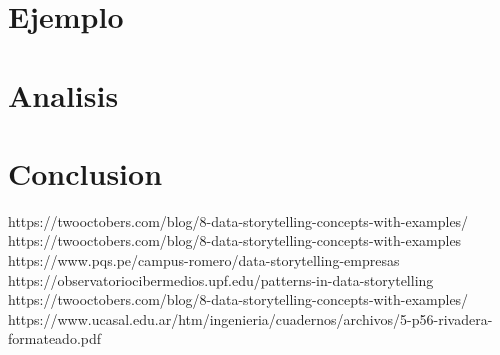 \documentclass[preprint,12pt]{elsarticle}
\begin{document}
\section{Ejemplo}

\section{Analisis}

\section{Conclusion}

	
	

	
	
	\newpage
	
	   \begin{thebibliography}{0}
                 https://twooctobers.com/blog/8-data-storytelling-concepts-with-examples/
                  https://twooctobers.com/blog/8-data-storytelling-concepts-with-examples
                   https://www.pqs.pe/campus-romero/data-storytelling-empresas
                   https://observatoriocibermedios.upf.edu/patterns-in-data-storytelling
                     https://twooctobers.com/blog/8-data-storytelling-concepts-with-examples/
                   https://www.ucasal.edu.ar/htm/ingenieria/cuadernos/archivos/5-p56-rivadera-formateado.pdf

         \end{thebibliography}

	
\end{document}
